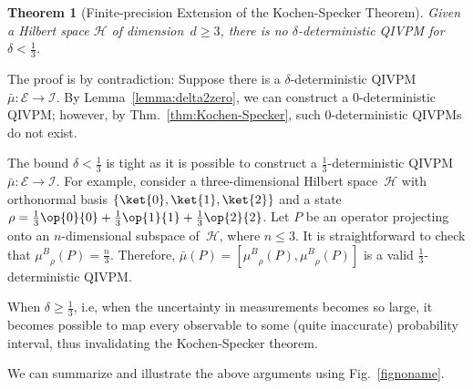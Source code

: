 \documentclass[english,reprint, aps, prl,superscriptaddress, showpacs,
showkeys, longbibliography, amsmath, amssymb, floatfix]{revtex4-1}
\theoremstyle{plain}
\newtheorem{thm}{Theorem}
\theoremstyle{definition}
\newcommand{\Hilb}{\mathcal{H}}
\newcommand{\events}{\ensuremath{\mathcal{E}}}
\newcommand{\proj}[1]{\op{#1}{#1}}
\newcommand{\muB}{\ensuremath{\mu^{B}}}
\begin{document}
\begin{thm}[Finite-precision Extension of the Kochen-Specker Theorem]
\label{cor:Kochen-Specker-IVPM} Given a Hilbert space $\Hilb$ of 
dimension~$d\ge3$, there is no $\delta$-deterministic QIVPM for 
$\delta<\frac{1}{3}$.\end{thm}
\noindent The proof is by contradiction: Suppose there is a
$\delta$-deterministic
QIVPM~$\bar{\mu}:\events\rightarrow\mathscr{I}$. By
Lemma~\ref{lemma:delta2zero}, we can construct a 0-deterministic QIVPM; however, by
Thm.~\ref{thm:Kochen-Specker}, such 0-deterministic QIVPMs do not
exist.

The bound $\delta < \frac{1}{3}$ is tight as it is possible to
construct a $\frac{1}{3}$-deterministic QIVPM
$\bar{\mu}:\events\rightarrow\mathscr{I}$. For example, consider a
three-dimensional Hilbert space~$\Hilb$ with orthonormal basis
$\left\{\ket{0},\ket{1},\ket{2}\right\}$ and a state
$\rho=\frac{1}{3}\proj{0}+\frac{1}{3}\proj{1}+\frac{1}{3}\proj{2}$.
Let $P$ be an operator projecting onto an $n$-dimensional subspace
of~$\Hilb$, where $n \leq 3$. It is straightforward to check that
$\muB_{\rho}\left(P\right)=\frac{n}{3}$. Therefore,
$\bar{\mu}\left(P\right)=\left[\muB_{\rho}\left(P\right),\muB_{\rho}\left(P\right)\right]$
is a valid $\frac{1}{3}$-deterministic QIVPM.

When $\delta \geq \frac{1}{3}$, i.e, when the uncertainty in
measurements becomes so large, it becomes possible to map every
observable to some (quite inaccurate) probability interval, thus
invalidating the Kochen-Specker theorem.

We can summarize and illustrate the above arguments using
Fig.~\ref{fignoname}. 
\end{document}
